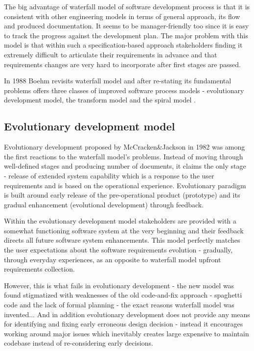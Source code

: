 The big advantage of waterfall model of software development process is that 
it is consistent with other engineering models in terms of general approach, 
its flow and produced documentation. It seems to be manager-friendly too since
it is easy to track the progress against the development plan. The major 
problem with this model is
that within such a specification-based approach stakeholders finding it 
extremely difficult to articulate their requirements in advance and 
that requirements changes are very hard to incorporate after first stages are passed.

In 1988 Boehm revisits waterfall model and after re-stating its fundamental problems 
offers three classes of improved software process models - evolutionary development 
model, the transform model and the spiral model \cite{citeulike:10002126}.

\subsection{Evolutionary development model}
Evolutionary development proposed by McCracken\&Jackson in 1982 \cite{citeulike:3996892}
was among the first reactions to the waterfall model's problems. Instead of moving 
through well-defined stages and producing number of documents, it claims the only
stage - release of extended system capability which is a response to the user 
requirements and is based on the operational experience. Evolutionary paradigm 
is built around early release of the pre-operational product (prototype) and its gradual 
enhancement (evolutional development) through feedback. 

Within the evolutionary development model stakeholders are provided with a somewhat 
functioning software system at the very beginning and their feedback directs all future
software system enhancements. This model perfectly matches the user expectations 
about the software requirements evolution - gradually, through everyday experiences, 
as an opposite to waterfall model upfront requirements collection. 

However, this is what fails in evolutionary development - the new model was found 
stigmatized with weaknesses of the old code-and-fix approach - spaghetti code and 
the lack of formal planning - the exact reasons waterfall model was invented... 
And in addition evolutionary development does not provide any means for identifying 
and fixing early erroneous design decision - instead it encourages working around 
major issues which inevitably creates large expensive to maintain codebase instead 
of re-considering early decisions.


